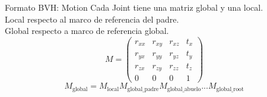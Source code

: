 \documentclass[aspectratio=169,spanish]{beamer} %
\begin{document}
\begin{frame}{Formato BVH: Motion}
    Cada Joint tiene una matriz global y una local. \\
    Local respecto al marco de referencia del padre. \\
    Global respecto a marco de referencia global. \vspace{0.5cm}
\begin{equation}\label{matriz_general}\nonumber
M = 
    \begin{pmatrix}
    r_{xx} & r_{xy} & r_{xz} & t_x \\
    r_{yx} & r_{yy} & r_{yz} & t_y \\
    r_{zx} & r_{zy} & r_{zz} & t_z \\
    0      & 0      & 0      & 1 
    \end{pmatrix}
\end{equation}
\vspace{0.5cm}
\begin{equation}\label{matriz_recursiva}\nonumber
    M_{\text{global}} = M_{\text{local}} M_{\text{global\_padre}} M_{\text{global\_abuelo}} ... M_{\text{global\_root}}
\end{equation}
\end{frame}
\end{document}
